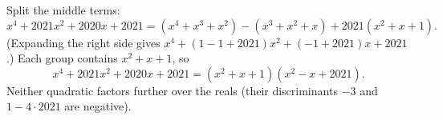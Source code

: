 Split the middle terms:
\[x^4+2021x^2+2020x+2021=(x^4+x^3+x^2)-(x^3+x^2+x)+2021(x^2+x+1).\]
(Expanding the right side gives $x^4+(1-1+2021)x^2+(-1+2021)x+2021$.) Each group contains $x^2+x+1$, so
\[x^4+2021x^2+2020x+2021=\boxed{(x^2+x+1)(x^2-x+2021)}.\]
Neither quadratic factors further over the reals (their discriminants $-3$ and $1-4\cdot2021$ are negative).
